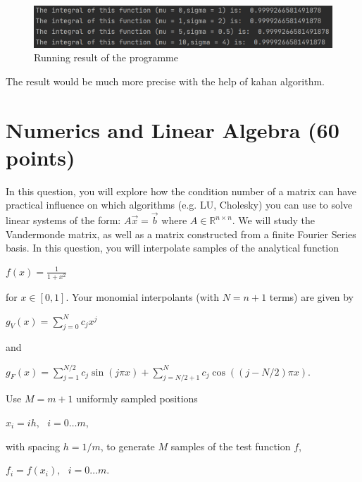 \documentclass[10pt]{article}
\begin{document}
\begin{enumerate}[label=2.\arabic*]
	\begin{figure}[H]
		\centering
		\includegraphics[width=1\textwidth]{./gaussian/result_2.png}
		\caption{Running result of the programme}
	\end{figure}
	The result would be much more precise with the help of kahan algorithm.
\end{enumerate}



\section{Numerics and Linear Algebra (60 points)}\label{sec:num_lin_alg}

In this question, you will explore how the condition number of a matrix can have practical influence on which algorithms (e.g. LU, Cholesky) you can use to solve linear systems of the form: $A\vec{x}=\vec{b}$ where $A\in \mathbb{R}^{n\times n}$.
We will study the Vandermonde matrix, as well as a matrix constructed from a finite Fourier Series basis.
In this question, you will interpolate samples of the analytical function

\begin{center}
$f(x)=\frac{1}{1+x^2}$    
\end{center}

for $x\in[0,1]$. Your monomial interpolants (with $N=n+1$ terms) are given by

\begin{center}
$g_V(x)=\sum_{j=0}^{N} c_j x^j$
\end{center}

and

\begin{center}
$g_{F}(x)=\sum_{j=1}^{N / 2} c_{j} \sin (j \pi x)+\sum_{j=N / 2+1}^{N} c_{j} \cos ((j-N / 2) \pi x)$.
\end{center}

Use $M=m+1$ uniformly sampled positions

\begin{center}
$x_i=ih,\text{ }i=0\dots m$,
\end{center}

with spacing $h=1/m$, to generate $M$ samples of the test function $f$,

\begin{center}
$f_i=f(x_i),\text{ }i=0\dots m$.
\end{center}
\end{document}
